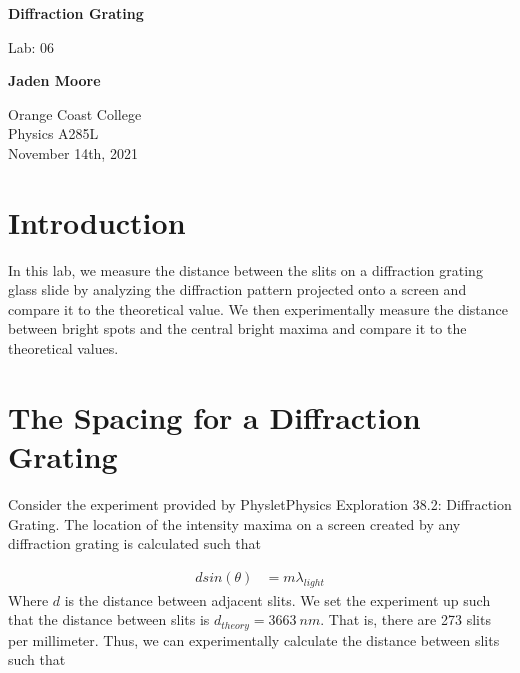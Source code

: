 \documentclass[12pt]{article}
\begin{document}

\begin{titlepage}
    \begin{center}
        \vspace*{1cm}
        \textbf{Diffraction Grating}

        \vspace{0.5cm}
        Lab: 06

        \vspace{1cm}

        \textbf{Jaden Moore}

        \vfill

        Orange Coast College\\
        Physics A285L\\
        November 14th, 2021

    \end{center}
\end{titlepage}

\pagestyle{fancy}
\fancyhf{}
\setlength{\headheight}{15pt}
\cfoot{\thepage}

\section{Introduction}
In this lab, we measure the distance between the slits on a diffraction grating glass slide by analyzing the diffraction pattern projected onto a screen and compare it to the theoretical value. We then experimentally measure the distance between bright spots and the central bright maxima and compare it to the theoretical values.

\section{The Spacing for a Diffraction Grating}
Consider the experiment provided by Physlet\textregistered \space Physics Exploration 38.2: Diffraction Grating. The location of the intensity maxima on a screen created by any diffraction grating is calculated such that

\begin{equation}
    \begin{split}
        dsin(\theta) &= m \lambda_{light}
    \end{split}
\end{equation}
Where $d$ is the distance between adjacent slits. We set the experiment up such that the distance between slits is $d_{theory}=\SI{3663}{nm}$. That is, there are 273 slits per millimeter. Thus, we can experimentally calculate the distance between slits such that
\end{document}
